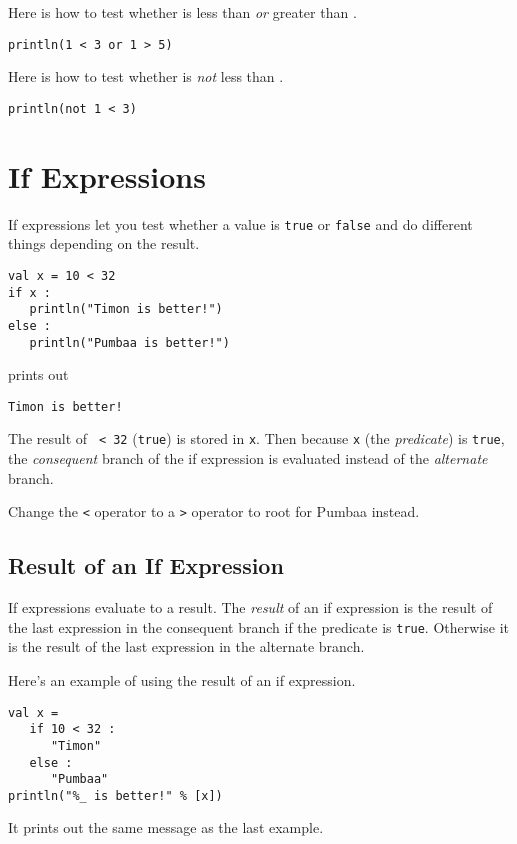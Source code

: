 \documentclass[10pt,oneside]{book}
\begin{document}
Here is how to test whether \texttt{} is less than \texttt{} {\em or} greater than \texttt{}.
\begin{lstlisting}
println(1 < 3 or 1 > 5)
\end{lstlisting}

Here is how to test whether \texttt{} is {\em not} less than \texttt{}.
\begin{lstlisting}
println(not 1 < 3)
\end{lstlisting}

\section{If Expressions}
If expressions let you test whether a value is \texttt{\frenchspacing true} or \texttt{\frenchspacing false} and do different things depending on the result.
\begin{lstlisting}
val x = 10 < 32
if x :
   println("Timon is better!")
else :
   println("Pumbaa is better!")
\end{lstlisting}
prints out
\begin{lstlisting}
Timon is better!
\end{lstlisting}

The result of \texttt{ < 32} (\texttt{\frenchspacing true}) is stored in \texttt{\frenchspacing x}. Then because \texttt{\frenchspacing x} (the {\em predicate}) is \texttt{\frenchspacing true}, the {\em consequent} branch of the if expression is evaluated instead of the {\em alternate} branch.

Change the \texttt{\frenchspacing <} operator to a \texttt{\frenchspacing >} operator to root for Pumbaa instead.

\subsection*{Result of an If Expression}
If expressions evaluate to a result. The {\em result} of an if expression is the result of the last expression in the consequent branch if the predicate is \texttt{\frenchspacing true}. Otherwise it is the result of the last expression in the alternate branch.

Here's an example of using the result of an if expression.
\begin{lstlisting}
val x =
   if 10 < 32 :
      "Timon"
   else :
      "Pumbaa"
println("%_ is better!" % [x])
\end{lstlisting}
It prints out the same message as the last example.
\end{document}
